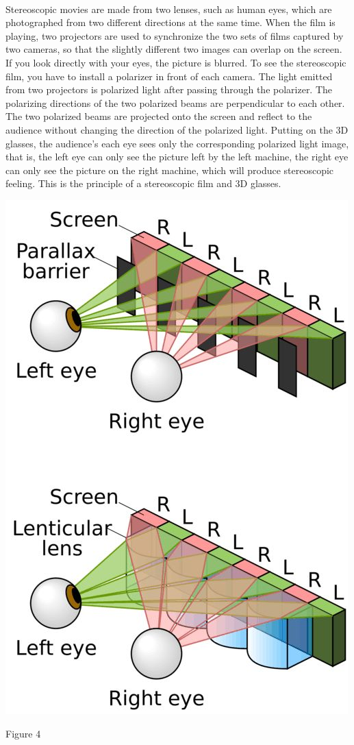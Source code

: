 \documentclass[]{report}
\begin{document}
\paragraph{} Stereoscopic movies are made from two lenses, such as human eyes, which are photographed from two different directions at the same time. When the film is playing, two projectors are used to synchronize the two sets of films captured by two cameras, so that the slightly different two images can overlap on the screen. If you look directly with your eyes, the picture is blurred. To see the stereoscopic film, you have to install a polarizer in front of each camera. The light emitted from two projectors is polarized light after passing through the polarizer. The polarizing directions of the two polarized beams are perpendicular to each other. The two polarized beams are projected onto the screen and reflect to the audience without changing the direction of the polarized light. Putting on the 3D glasses, the audience's each eye sees only the corresponding polarized light image, that is, the left eye can only see the picture left by the left machine, the right eye can only see the picture on the right machine, which will produce stereoscopic feeling. This is the principle of a stereoscopic film and 3D glasses.\newline\newline
\centerline{\includegraphics[scale=0.4]{figure2.jpg}}\newline
\centerline{Figure 4}
\end{document}

